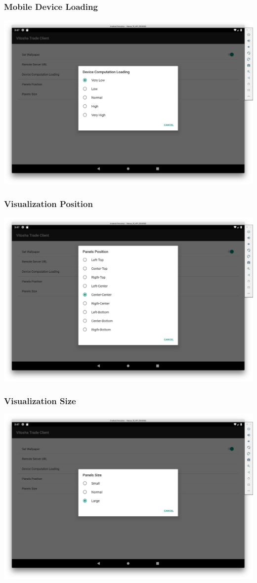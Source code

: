 \documentclass{beamer}
\begin{document}
\begin{frame}
\frametitle{Mobile Device Loading}
\includegraphics[scale=0.15]{fig04}
\end{frame}

\begin{frame}
\frametitle{Visualization Position}
\includegraphics[scale=0.15]{fig05}
\end{frame}

\begin{frame}
\frametitle{Visualization Size}
\includegraphics[scale=0.15]{fig06}
\end{frame}
\end{document}
